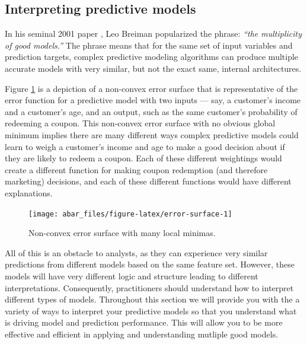 \documentclass[]{book}
\theoremstyle{definition}
\theoremstyle{definition}
\theoremstyle{definition}
\theoremstyle{remark}
\begin{document}
\hypertarget{interpreting-predictive-models}{%
\subsection{Interpreting predictive
models}\label{interpreting-predictive-models}}

In his seminal 2001 paper \citep{breiman2001statistical}, Leo Breiman
popularized the phrase: \emph{``the multiplicity of good models.''} The
phrase means that for the same set of input variables and prediction
targets, complex predictive modeling algorithms can produce multiple
accurate models with very similar, but not the exact same, internal
architectures.

Figure \ref{fig:error-surface} is a depiction of a non-convex error
surface that is representative of the error function for a predictive
model with two inputs --- say, a customer's income and a customer's age,
and an output, such as the same customer's probability of redeeming a
coupon. This non-convex error surface with no obvious global minimum
implies there are many different ways complex predictive models could
learn to weigh a customer's income and age to make a good decision about
if they are likely to redeem a coupon. Each of these different
weightings would create a different function for making coupon
redemption (and therefore marketing) decisions, and each of these
different functions would have different explanations.

\begin{figure}

{\centering \texttt{[image: abar\_files/figure-latex/error-surface-1]} 

}

\caption{Non-convex error surface with many local minimas.}\label{fig:error-surface}
\end{figure}

All of this is an obstacle to analysts, as they can experience very
similar predictions from different models based on the same feature set.
However, these models will have very different logic and structure
leading to different interpretations. Consequently, practitioners should
understand how to interpret different types of models. Throughout this
section we will provide you with the a variety of ways to interpret your
predictive models so that you understand what is driving model and
prediction performance. This will allow you to be more effective and
efficient in applying and understanding mutliple good models.
\end{document}
